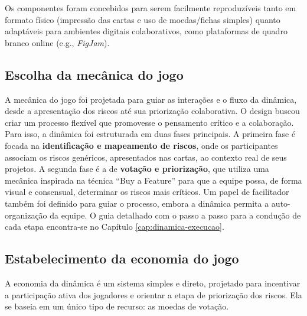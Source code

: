 \documentclass[
	12pt,
	openright,
	twoside,
	a4paper,
	english,
	brazil
	]{abntex2}
\begin{document}
Os componentes foram concebidos para serem facilmente reproduzíveis tanto em formato físico (impressão das cartas e uso de moedas/fichas simples) quanto adaptáveis para ambientes digitais colaborativos, como plataformas de quadro branco online (e.g., \textit{FigJam}). 

\subsection{Escolha da mecânica do jogo}
\label{sec:escolha-mecanicas}

A mecânica do jogo foi projetada para guiar as interações e o fluxo da dinâmica, desde a apresentação dos riscos até sua priorização colaborativa. O design buscou criar um processo flexível que promovesse o pensamento crítico e a colaboração. Para isso, a dinâmica foi estruturada em duas fases principais. A primeira fase é focada na \textbf{identificação e mapeamento de riscos}, onde os participantes associam os riscos genéricos, apresentados nas cartas, ao contexto real de seus projetos. A segunda fase é a de \textbf{votação e priorização}, que utiliza uma mecânica inspirada na técnica “Buy a Feature” para que a equipe possa, de forma visual e consensual, determinar os riscos mais críticos. Um papel de facilitador também foi definido para guiar o processo, embora a dinâmica permita a auto-organização da equipe. O guia detalhado com o passo a passo para a condução de cada etapa encontra-se no Capítulo \ref{cap:dinamica-execucao}.

\subsection{Estabelecimento da economia do jogo}
\label{sec:economia-jogo}

A economia da dinâmica é um sistema simples e direto, projetado para incentivar a participação ativa dos jogadores e orientar a etapa de priorização dos riscos. Ela se baseia em um único tipo de recurso: as moedas de votação.
\end{document}
